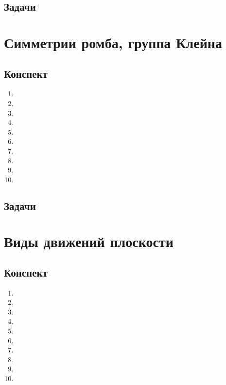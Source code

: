 \subsection{Задачи}


\section{Симметрии ромба, группа Клейна}

\subsection{Конспект}
\begin{enumerate}\setlength{\itemsep}{1pt}
\item 
\item 
\item 
\item 
\item 
\item 
\item 
\item 
\item 
\item 
\end{enumerate}
\subsection{Задачи}






\section{Виды движений плоскости}

\subsection{Конспект}
\begin{enumerate}\setlength{\itemsep}{1pt}
\item 
\item 
\item 
\item 
\item 
\item 
\item 
\item 
\item 
\item 
\end{enumerate}
